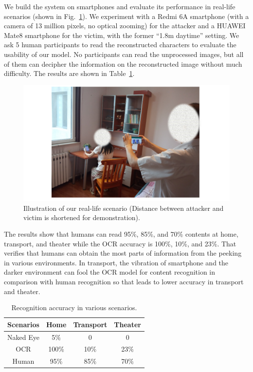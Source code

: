 We build the system on smartphones and evaluate its performance in real-life scenarios (shown in Fig.~\ref{fig-reallife}). We experiment with a Redmi 6A smartphone (with a camera of 13 million pixels, no optical zooming) for the attacker and a HUAWEI Mate8 smartphone for the victim, with the former ``1.8m daytime'' setting. We ask 5 human participants to read the reconstructed characters to evaluate the usability of our model. No participants can read the unprocessed images, but all of them can decipher the information on the reconstructed image without much difficulty. The results are shown in Table~\ref{table-scenarios}.
\begin{figure}
	\centering
	\includegraphics[width=0.80\linewidth]{pic/reallife.pdf}
    \caption{Illustration of our real-life scenario (Distance between attacker and victim is shortened for demonstration).}
	\label{fig-reallife}
\end{figure}

The results show that humans can read 95\%, 85\%, and 70\% contents at home, transport, and theater while the OCR accuracy is 100\%, 10\%, and 23\%. That verifies that humans can obtain the most parts of information from the peeking in various environments. In transport, the vibration of smartphone and the darker environment can fool the OCR model for content recognition in comparison with human recognition so that leads to lower accuracy in transport and theater.

\begin{table}[!t]
    \centering
    \caption{Recognition accuracy in various scenarios.}
    \begin{tabular}{@{}cccc@{}}
        \toprule
    Scenarios & Home & Transport & Theater \\ \midrule
    Naked Eye & 5\% & 0 & 0\\ 
    \midrule
    OCR & 100\% & 10\% & 23\%\\ 
    Human & 95\% & 85\% & 70\%\\ \bottomrule
    \end{tabular}
    \label{table-scenarios}
\end{table}


